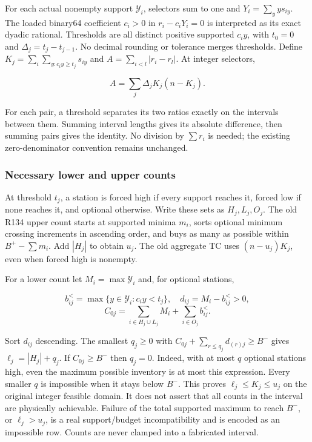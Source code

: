 \documentclass[
  american,
  11pt,
]{article}
\newcounter{none} %
\begin{document}
For each actual nonempty support \(\mathcal Y_i\), selectors sum to one
and \(Y_i=\sum_yys_{iy}\). The loaded binary64 coefficient \(c_i>0\) in
\(r_i-c_iY_i=0\) is interpreted as its exact dyadic rational. Thresholds
are all distinct positive supported \(c_iy\), with \(t_0=0\) and
\(\Delta_j=t_j-t_{j-1}\). No decimal rounding or tolerance merges
thresholds. Define \(K_j=\sum_i\sum_{y:c_iy\ge t_j}s_{iy}\) and
\(A=\sum_{i<l}|r_i-r_l|\). At integer selectors,

\[
A=\sum_j\Delta_j K_j(n-K_j).
\]

For each pair, a threshold separates its two ratios exactly on the
intervals between them. Summing interval lengths gives its absolute
difference, then summing pairs gives the identity. No division by
\(\sum r_i\) is needed; the existing zero-denominator convention remains
unchanged.

\subsubsection{Necessary lower and upper
counts}\label{necessary-lower-and-upper-counts}

At threshold \(t_j\), a station is forced high if every support reaches
it, forced low if none reaches it, and optional otherwise. Write these
sets as \(H_j,L_j,O_j\). The old R134 upper count starts at supported
minima \(m_i\), sorts optional minimum crossing increments in ascending
order, and buys as many as possible within \(B^+-\sum m_i\). Add
\(|H_j|\) to obtain \(u_j\). The old aggregate TC uses \((n-u_j)K_j\),
even when forced high is nonempty.

For a lower count let \(M_i=\max\mathcal Y_i\) and, for optional
stations,

\[
b_{ij}^{<}=\max\{y\in\mathcal Y_i:c_iy<t_j\},\quad
d_{ij}=M_i-b_{ij}^{<}>0,
\] \[
C_{0j}=\sum_{i\in H_j\cup L_j}M_i+
         \sum_{i\in O_j}b_{ij}^{<}.
\]

Sort \(d_{ij}\) descending. The smallest \(q_j\ge0\) with
\(C_{0j}+\sum_{r\le q_j}d_{(r)j}\ge B^-\) gives \(\ell_j=|H_j|+q_j\). If
\(C_{0j}\ge B^-\) then \(q_j=0\). Indeed, with at most \(q\) optional
stations high, even the maximum possible inventory is at most this
expression. Every smaller \(q\) is impossible when it stays below
\(B^-\). This proves \(\ell_j\le K_j\le u_j\) on the original integer
feasible domain. It does not assert that all counts in the interval are
physically achievable. Failure of the total supported maximum to reach
\(B^-\), or \(\ell_j>u_j\), is a real support/budget incompatibility and
is encoded as an impossible row. Counts are never clamped into a
fabricated interval.
\end{document}
